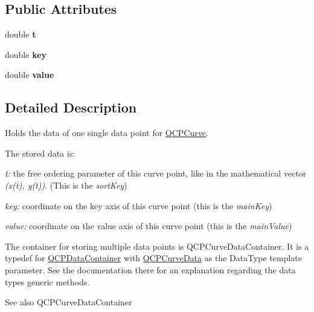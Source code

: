 \subsection*{Public Attributes}
\begin{DoxyCompactItemize}
\item 
\mbox{\label{class_q_c_p_curve_data_aecc395525be28e9178a088793beb3ff3}} 
double {\bfseries t}
\item 
\mbox{\label{class_q_c_p_curve_data_a8a4ec5f2b9a396149fd842e309701bd4}} 
double {\bfseries key}
\item 
\mbox{\label{class_q_c_p_curve_data_a72b39b8e1dbf7b45382ebd48419b6828}} 
double {\bfseries value}
\end{DoxyCompactItemize}


\subsection{Detailed Description}
Holds the data of one single data point for \mbox{\hyperlink{class_q_c_p_curve}{Q\+C\+P\+Curve}}. 

The stored data is\+: \begin{DoxyItemize}
\item {\itshape t\+:} the free ordering parameter of this curve point, like in the mathematical vector {\itshape (x(t), y(t))}. (This is the {\itshape sort\+Key}) \item {\itshape key\+:} coordinate on the key axis of this curve point (this is the {\itshape main\+Key}) \item {\itshape value\+:} coordinate on the value axis of this curve point (this is the {\itshape main\+Value})\end{DoxyItemize}
The container for storing multiple data points is Q\+C\+P\+Curve\+Data\+Container. It is a typedef for \mbox{\hyperlink{class_q_c_p_data_container}{Q\+C\+P\+Data\+Container}} with \mbox{\hyperlink{class_q_c_p_curve_data}{Q\+C\+P\+Curve\+Data}} as the Data\+Type template parameter. See the documentation there for an explanation regarding the data type\textquotesingle{}s generic methods.

\begin{DoxySeeAlso}{See also}
Q\+C\+P\+Curve\+Data\+Container 
\end{DoxySeeAlso}



